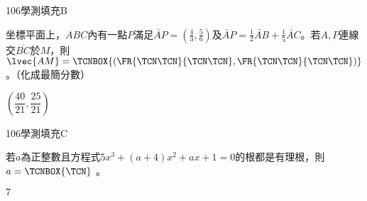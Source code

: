     \begin{QUESTION}
        \begin{ExamInfo}{106}{學測}{填充}{B}
        \end{ExamInfo}
        \begin{ExamAnsRateInfo}{26}{65}{12}{1}
        \end{ExamAnsRateInfo}
        \begin{QBODY}
            坐標平面上，$ABC$內有一點$P$滿足$\lvec{AP}=(\frac{4}{3},\frac{5}{6})$及$\lvec{AP}=\frac{1}{2}\lvec{AB}+\frac{1}{5}\lvec{AC}$。若$A,P$連線交$\overline{BC}$於$M$，則$\lvec{AM}= \TCNBOX{\left(\FR{\TCN\TCN}{\TCN\TCN} ,\FR{\TCN\TCN}{\TCN\TCN} \right)}$。（化成最簡分數）
        \end{QBODY}
        \begin{QFROMS}
        \end{QFROMS}
        \begin{QTAGS}\end{QTAGS}
        \begin{QANS}
            $(\dfrac{40}{21},\dfrac{25}{21})$
        \end{QANS}
        \begin{QSOLLIST}
        \end{QSOLLIST}
        \begin{QEMPTYSPACE}
        \end{QEMPTYSPACE}
    \end{QUESTION}
    \begin{QUESTION}
        \begin{ExamInfo}{106}{學測}{填充}{C}
        \end{ExamInfo}
        \begin{ExamAnsRateInfo}{30}{63}{22}{5}
        \end{ExamAnsRateInfo}
        \begin{QBODY}
            若$a$為正整數且方程式$5{{x}^{3}}+(a+4){{x}^{2}}+ax+1=0$的根都是有理根，則$a= \TCNBOX{\TCN}$     。
        \end{QBODY}
        \begin{QFROMS}
        \end{QFROMS}
        \begin{QTAGS}\end{QTAGS}
        \begin{QANS}
            $7$
        \end{QANS}
        \begin{QSOLLIST}
        \end{QSOLLIST}
        \begin{QEMPTYSPACE}
        \end{QEMPTYSPACE}
    \end{QUESTION}
